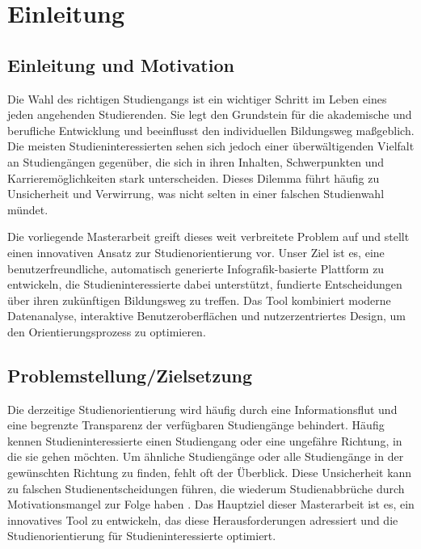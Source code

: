 \section{Einleitung}\label{einleitung}
\subsection{Einleitung und Motivation}\label{einleitung-und-motivation}
Die Wahl des richtigen Studiengangs ist ein wichtiger Schritt im Leben eines
jeden angehenden Studierenden. Sie legt den Grundstein für die akademische und
berufliche Entwicklung und beeinflusst den individuellen Bildungsweg maßgeblich.
Die meisten Studieninteressierten sehen sich jedoch einer überwältigenden
Vielfalt an Studiengängen gegenüber, die sich in ihren Inhalten, Schwerpunkten
und Karrieremöglichkeiten stark unterscheiden. Dieses Dilemma führt häufig zu
Unsicherheit und Verwirrung, was nicht selten in einer falschen Studienwahl
mündet. \parencite{verbesserung-der-studienorientierung}

Die vorliegende Masterarbeit greift dieses weit verbreitete Problem auf und
stellt einen innovativen Ansatz zur Studienorientierung vor. Unser Ziel ist es,
eine benutzerfreundliche, automatisch generierte Infografik-basierte Plattform
zu entwickeln, die Studieninteressierte dabei unterstützt, fundierte
Entscheidungen über ihren zukünftigen Bildungsweg zu treffen. Das Tool
kombiniert moderne Datenanalyse, interaktive Benutzeroberflächen und
nutzerzentriertes Design, um den Orientierungsprozess zu optimieren.

\subsection{Problemstellung/Zielsetzung}\label{problemstellung-zielsetzung}
Die derzeitige Studienorientierung wird häufig durch eine Informationsflut und
eine begrenzte Transparenz der verfügbaren Studiengänge behindert. Häufig kennen
Studieninteressierte einen Studiengang oder eine ungefähre Richtung, in die sie
gehen möchten. Um ähnliche Studiengänge oder alle Studiengänge in der
gewünschten Richtung zu finden, fehlt oft der Überblick.
\parencite{verbesserung-der-studienorientierung} Diese Unsicherheit kann
zu falschen Studienentscheidungen führen, die wiederum Studienabbrüche durch
Motivationsmangel zur Folge haben \parencite{ursachen-studienabbruch}. Das
Hauptziel dieser Masterarbeit ist es, ein innovatives Tool zu entwickeln, das
diese Herausforderungen adressiert und die Studienorientierung für
Studieninteressierte optimiert.

